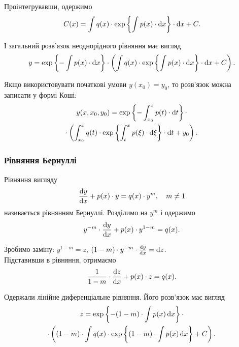 Проінтегрувавши, одержимо
\begin{equation} 
	\label{eq:1.3.5}
	C(x) = \int q(x) \cdot \exp \left\{\int p(x) \cdot \mathop{}\!\mathrm{d} x \right\} \cdot \mathop{}\!\mathrm{d} x + C.
\end{equation}

І загальний розв’язок неоднорідного рівняння має вигляд
\begin{equation} 
	\label{eq:1.3.6}
	y = \exp \left\{ - \int p(x) \cdot \mathop{}\!\mathrm{d} x \right\} \cdot \left( \int q(x) \cdot \exp \left\{\int p(x) \cdot \mathop{}\!\mathrm{d} x \right\} \cdot \mathop{}\!\mathrm{d} x + C\right).
\end{equation}

Якщо використовувати початкові умови $y(x_0) = y_0$, то розв’язок можна записати у формі Коші:
\begin{multline} 
	\label{eq:1.3.7}
	y(x, x_0, y_0) = \exp \left\{ - \int_{x_0}^x p(t) \cdot \mathop{}\!\mathrm{d} t \right\} \cdot \\
	\cdot \left( \int_{x_0}^x q(t) \cdot \exp \left\{\int_t^x p(\xi) \cdot \mathop{}\!\mathrm{d} \xi \right\} \cdot \mathop{}\!\mathrm{d} t + y_0\right).
\end{multline}

\subsubsection{Рівняння Бернуллі}

Рівняння вигляду
\begin{equation}
	\label{eq:1.3.8}
	\frac{\mathop{}\!\mathrm{d} y}{\mathop{}\!\mathrm{d} x} + p(x) \cdot y = q(x) \cdot y^m, \quad m \ne 1
\end{equation}
називається рівнянням Бернуллі. Розділимо на $y^m$ і одержимо 
\begin{equation}
	\label{eq:1.3.9}
	y^{-m} \cdot \frac{\mathop{}\!\mathrm{d} y}{\mathop{}\!\mathrm{d} x} + p(x) \cdot y^{1-m} = q(x).
\end{equation}

Зробимо заміну: $y^{1-m} = z$, $(1 - m) \cdot y^{-m} \cdot \frac{\mathop{}\!\mathrm{d} y}{\mathop{}\!\mathrm{d} x} = \mathop{}\!\mathrm{d} z$. \\

Підставивши в рівняння, отримаємо
\begin{equation}
	\label{eq:1.3.10}
	\frac{1}{1-m} \cdot \frac{\mathop{}\!\mathrm{d} z}{\mathop{}\!\mathrm{d} x} + p(x) \cdot z = q(x).
\end{equation}

Одержали лінійне диференціальне рівняння. Його розв’язок має вигляд
\begin{multline}
	\label{eq:1.3.11}
	z = \exp\left\{ -(1 - m) \cdot \int p(x) \mathop{}\!\mathrm{d} x \right\} \cdot \\
	\cdot \left( (1-m) \cdot \int q(x) \cdot \exp\left\{ (1 - m) \cdot \int p(x) \mathop{}\!\mathrm{d} x \right\} + C\right).
\end{multline}
 
